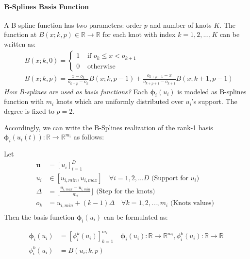\documentclass[11pt]{article}
\begin{document}
    \paragraph{B-Splines Basis Function} A B-spline function has two parameters: order $p$ and number of knots $K$.
    The function at $B(x;k,p) \in \mathbb{R} \rightarrow \mathbb{R}$ for each knot with index
    $k=1,2,\dots,K$ can be written as:
    \begin{equation}
        \begin{aligned}
            & B(x;k,0)=
            \begin
            {cases}
                1 & \text { if } o_k \leq x<o_{k+1} \\ 0 & \text { otherwise }
            \end{cases} \\ & B(x;k,p)=\frac{x-o_k}{o_{k+p}-o_k} B(x;k,p-1)+\frac{o_{k+p+1}-x}{o_{k+p+1}-o_{k+1}} B(x;k+1, p-1)
        \end{aligned}\label{eq:b-splines-basis}
    \end{equation}
    \textit{How B-splines are used as basis functions?}
    Each $\bm{\phi}_i(u_i)$ is modeled as B-splines function with $m_i$ knots which are uniformly distributed over $u_i$'s support.
    The degree is fixed to $p=2$\cite{novikov2022tensortrain}.


    Accordingly, we can write the B-Splines realization of the rank-1 basis
    $\bm{\phi}_i(u_i(t)) : \mathbb{R} \rightarrow \mathbb{R}^{m_i}$ as follows:


    Let
    \begin{align*}
        \mathbf{u} &=[u_i]_{i=1}^{D}\\
        u_i &\in [u_{i,min},u_{i,max}] \quad \forall i=1,2,\dots D  \text{ (Support for $u_i$) }\\
        \Delta &=\lfloor \frac{u_{i,max}-u_{i,min}}{m_i} \rfloor \text{ (Step for the knots) }\\
        o_{k} &= u_{i,min} + (k-1)\Delta \quad \forall k=1,2,\dots,m_i \text{ (Knots values) }\\
    \end{align*}
    Then the basis function $\bm{\phi}_i(u_i)$ can be formulated as:

    \begin{equation}
        \label{eq:b-splines-basis-ftt}
        \begin{aligned}
            \bm{\phi}_i(u_i) &= [\phi_i^k(u_i)]_{k=1}^{m_i} \quad \bm{\phi}_i(u_i) : \mathbb{R} \rightarrow
            \mathbb{R}^{m_i},\phi_i^k(u_i) : \mathbb{R} \rightarrow \mathbb{R}\\
            \phi_i^k(u_i) &= B(u_i;k,p)\\
        \end{aligned}
    \end{equation}
\end{document}

